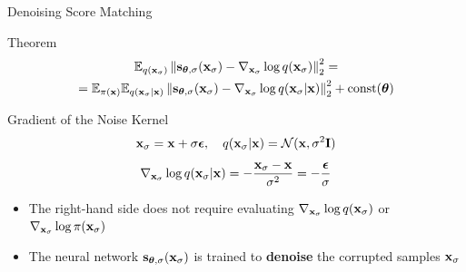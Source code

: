 \documentclass{beamer}
\begin{document}
\begin{frame}{Denoising Score Matching}
	\begin{block}{Theorem}
		\vspace{-0.5cm}
		\begin{multline*}
			\mathbb{E}_{q(\mathbf{x}_{\sigma})}\left\| \mathbf{s}_{\boldsymbol{\theta}, \sigma}(\mathbf{x}_{\sigma}) - \nabla_{\mathbf{x}_{\sigma}} \log q(\mathbf{x}_{\sigma}) \right\|_2^2 = \\
			= \mathbb{E}_{\pi(\mathbf{x})} \mathbb{E}_{q(\mathbf{x}_{\sigma} | \mathbf{x})}\left\| \mathbf{s}_{\boldsymbol{\theta}, \sigma}(\mathbf{x}_{\sigma}) - \nabla_{\mathbf{x}_{\sigma}} \log q(\mathbf{x}_{\sigma} | \mathbf{x}) \right\|_2^2 + \text{const}(\boldsymbol{\theta})
		\end{multline*}
		\vspace{-0.5cm}
	\end{block}
    \eqpause
	\begin{block}{Gradient of the Noise Kernel}
		\vspace{-0.3cm}
		\[
			\mathbf{x}_{\sigma} = \mathbf{x} + \sigma \boldsymbol{\epsilon}, \quad q(\mathbf{x}_{\sigma} | \mathbf{x}) = \mathcal{N}(\mathbf{x}, \sigma^2 \mathbf{I})
		\]
		\vspace{-0.3cm}
		\[
			\nabla_{\mathbf{x}_{\sigma}} \log q(\mathbf{x}_{\sigma} | \mathbf{x}) = - \frac{\mathbf{x}_{\sigma} - \mathbf{x}}{\sigma^2}  = - \frac{\boldsymbol{\epsilon}}{\sigma}
		\]
		\vspace{-0.5cm}
	\end{block}
    \eqpause
	\begin{itemize}
		\item The right-hand side does not require evaluating $\nabla_{\mathbf{x}_{\sigma}} \log q(\mathbf{x}_{\sigma})$ or $\nabla_{\mathbf{x}_{\sigma}} \log \pi(\mathbf{x}_{\sigma})$
		\item The neural network $\mathbf{s}_{\boldsymbol{\theta}, \sigma}(\mathbf{x}_{\sigma})$ is trained to \textbf{denoise} the corrupted samples $\mathbf{x}_{\sigma}$
	\end{itemize}
\end{frame}
\end{document}
